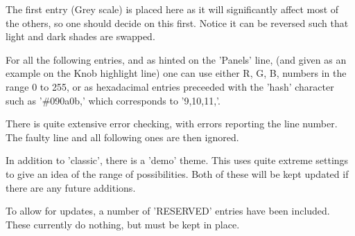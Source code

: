    The first entry (Grey scale) is placed here as it will significantly affect
   most of the others, so one should decide on this first. Notice it can be
   reversed such that light and dark shades are swapped.

   For all the following entries, and as hinted on the 'Panels' line, (and given
   as an example on the Knob highlight line) one can use either R, G, B, numbers
   in the range 0 to 255, or as hexadacimal entries preceeded with the 'hash'
   character such as '\#090a0b,' which corresponds to '9,10,11,'.

   There is quite extensive error checking, with errors reporting the line
   number. The faulty line and all following ones are then ignored.

   In addition to 'classic', there is a 'demo' theme. This uses quite extreme
   settings to give an idea of the range of possibilities. Both of these will be
   kept updated if there are any future additions.

   To allow for updates, a number of 'RESERVED' entries have been included. These
   currently do nothing, but must be kept in place.

